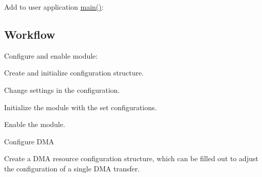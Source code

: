\begin{DoxyItemize}
\item Add to user application {\ttfamily \mbox{\hyperlink{csc__app_8c_a840291bc02cba5474a4cb46a9b9566fe}{main()}}}\+: 
\begin{DoxyCodeInclude}{0}
\end{DoxyCodeInclude}
 
\end{DoxyItemize}\hypertarget{asfdoc_sam0_sercom_i2c_master_dma_use_case_asfdoc_sam0_sercom_i2c_master_dma_use_setup_workflow}{}\subsection{Workflow}\label{asfdoc_sam0_sercom_i2c_master_dma_use_case_asfdoc_sam0_sercom_i2c_master_dma_use_setup_workflow}

\begin{DoxyEnumerate}
\item Configure and enable module\+: 
\begin{DoxyCodeInclude}{0}
\end{DoxyCodeInclude}

\begin{DoxyEnumerate}
\item Create and initialize configuration structure. 
\begin{DoxyCodeInclude}{0}
\end{DoxyCodeInclude}

\item Change settings in the configuration. 
\begin{DoxyCodeInclude}{0}
\end{DoxyCodeInclude}

\item Initialize the module with the set configurations. 
\begin{DoxyCodeInclude}{0}
\end{DoxyCodeInclude}

\item Enable the module. 
\begin{DoxyCodeInclude}{0}
\end{DoxyCodeInclude}

\end{DoxyEnumerate}
\item Configure D\+MA
\begin{DoxyEnumerate}
\item Create a D\+MA resource configuration structure, which can be filled out to adjust the configuration of a single D\+MA transfer. 
\begin{DoxyCodeInclude}{0}
\end{DoxyCodeInclude}


\end{DoxyEnumerate}
\end{DoxyEnumerate}
